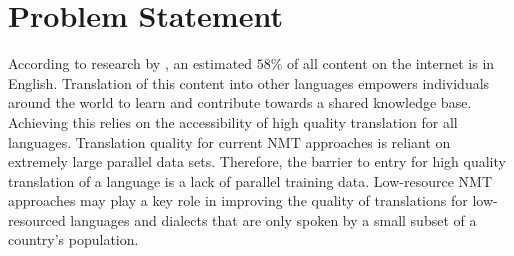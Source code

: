 %
%
%
%
%


\section{Problem Statement}
According to research by \cite{w3_internet_2020}, an estimated $58$\% of all content on the internet is in English. Translation of this content into other languages empowers individuals around the world to learn and contribute towards a shared knowledge base. Achieving this relies on the accessibility of high quality translation for all languages. Translation quality for current \acrshort{NMT} approaches is reliant on extremely large parallel data sets. Therefore, the barrier to entry for high quality translation of a language is a lack of parallel training data. Low-resource \acrshort{NMT} approaches may play a key role in improving the quality of translations for low-resourced languages and dialects that are only spoken by a small subset of a country's population.

